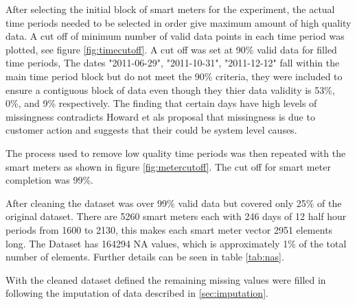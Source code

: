 After selecting the initial block of smart meters for the experiment, the actual time periods needed to be selected in order give maximum amount of high quality data. A cut off of minimum number of valid data points in each time period was plotted, see figure \ref{fig:timecutoff}. A cut off was set at 90\% valid data for filled time periods, The dates "2011-06-29", "2011-10-31", "2011-12-12" fall within the main time period block but do not meet the 90\% criteria, they were included to ensure a contiguous block of data even though they thier data validity is 53\%, 0\%, and 9\% respectively. The finding that certain days have high levels of missingness contradicts Howard et als proposal that missingness is due to customer action and suggests that their could be system level causes.

The process used to remove low quality time periods was then repeated with the smart meters as shown in figure \ref{fig:metercutoff}. The cut off for smart meter completion was 99\%.

After cleaning  the dataset was over 99\% valid data but covered only 25\% of the original dataset. There are 5260 smart meters each with 246 days of 12 half hour periods from 1600 to 2130, this makes each smart meter vector 2951 elements long. The Dataset has 164294 NA values, which is approximately 1\% of the total number of elements.
Further details can be seen in table \ref{tab:nas}. 

With the cleaned dataset defined the remaining missing values were filled in following the imputation of data described in \ref{sec:imputation}.

